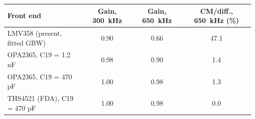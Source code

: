 \begin{tabular}{l S[table-format=1.2] S[table-format=1.2] S[table-format=2.2]}
\toprule
Front end & {Gain, \SI{300}{kHz}} & {Gain, \SI{650}{kHz}} & {CM/diff., \SI{650}{kHz} (\si{\percent})} \\
\midrule
LMV358 (present, fitted GBW) & 0.90 & 0.66 & 47.1 \\
OPA2365, C19 = 1.2 nF & 0.98 & 0.90 & 1.4 \\
OPA2365, C19 = 470 pF & 1.00 & 0.98 & 1.3 \\
THS4521 (FDA), C19 = 470 pF & 1.00 & 0.98 & 0.0 \\
\bottomrule
\end{tabular}

